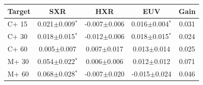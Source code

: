 \begin{tabular}{lcccc}
\toprule
Target & SXR & HXR & EUV & Gain \\
\midrule
C+ 15 & 0.021$\pm$0.009$^{*}$ & -0.007$\pm$0.006 & 0.016$\pm$0.004$^{*}$ & 0.031 \\
C+ 30 & 0.018$\pm$0.015$^{*}$ & -0.012$\pm$0.006 & 0.018$\pm$0.015$^{*}$ & 0.024 \\
C+ 60 & 0.005$\pm$0.007 & 0.007$\pm$0.017 & 0.013$\pm$0.014 & 0.025 \\
M+ 30 & 0.054$\pm$0.022$^{*}$ & 0.006$\pm$0.006 & 0.012$\pm$0.012 & 0.071 \\
M+ 60 & 0.068$\pm$0.028$^{*}$ & -0.007$\pm$0.020 & -0.015$\pm$0.024 & 0.046 \\
\bottomrule
\end{tabular}
